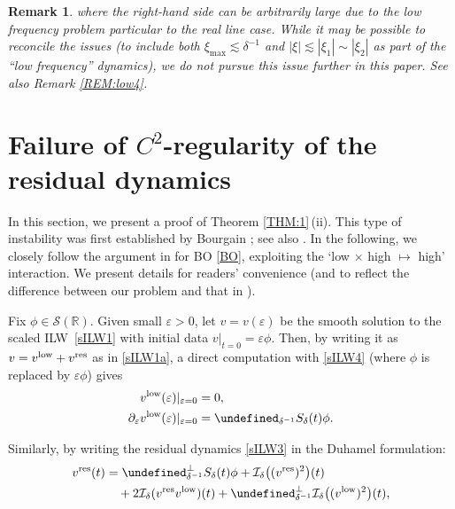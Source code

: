 \documentclass[letterpaper, 11pt,  reqno]{amsart}
\newtheorem{remark}[theorem]{Remark}
\newcommand{\1}{\hspace{0.5mm}\textup{I}\hspace{0.5mm}}
\newcommand{\I}{\mathcal{I}}
\newcommand{\noi}{\noindent}
\newcommand{\R}{\mathbb{R}}
\let\P= \undefined
\newcommand{\P}{\mathbf{P}}
\newcommand{\low}{\textup{low}}
\newcommand{\high}{\textup{res}}
\newcommand{\dl}{\delta}
\newcommand{\eps}{\varepsilon}
\newcommand{\dd}{\partial}
\newcommand{\les}{\lesssim}
\renewcommand{\S}{\mathcal{S}}
\numberwithin{equation}{section}
\numberwithin{theorem}{section}
\begin{document}
\begin{remark}
\noi
where the right-hand side can be arbitrarily large
due to the low frequency problem particular
to the real line case.
While it may be possible to reconcile the issues
(to include
both 
$\xi_{\max} \les \dl^{-1}$
and
$ |\xi| \les |\xi_1| \sim |\xi_2|$ as part of the ``low frequency'' dynamics), 
we do not pursue this issue further in this paper.
See also Remark \ref{REM:low4}.
\end{remark}




\section{Failure of $C^2$-regularity of the residual dynamics}
\label{SEC:high}


In this section, we present a proof of Theorem \ref{THM:1}\,(ii).
This type of instability was first established by Bourgain \cite{BO97};
see also \cite{Tzv}.
In the following, we closely 
follow the argument in \cite{MST}
for BO \eqref{BO}, 
exploiting 
the `low $\times$ high $\mapsto$ high' interaction.
We present details for readers' convenience
(and to reflect the difference between our problem and that in \cite{MST}).






Fix $\phi \in \S(\R)$.
Given small $\eps > 0$,
let  $v  = v(\eps)$ be the smooth solution to the scaled ILW~\eqref{sILW1}
with initial data $v|_{t = 0} = \eps \phi$.
Then, by writing  it as
$v = v^\low + v^\high$ as in \eqref{sILW1a}, 
a direct computation with \eqref{sILW4}
(where $\phi$ is replaced by $\eps \phi$)
gives
\begin{align}
\begin{split}
v^\low(\eps)|_{\eps = 0} & = 0, \\
\dd_\eps v^\low(\eps)|_{\eps = 0} 
& =  \P_{ \dl^{-1}} S_\dl(t) \phi.
\end{split}
\label{der1}
\end{align}

\noi
Similarly,
by writing 
the residual dynamics \eqref{sILW3} in the Duhamel formulation:
\begin{align}
\begin{split}
v^\high(t) 
& =  \P_{ \dl^{-1}}^\perp S_\dl(t) \phi
+ \I_\dl\big( (v^\high)^2\big)(t)\\
& \quad 
+ 2 \I_\dl( v^\high v^\low)(t)
+ \P_{ \dl^{-1}}^\perp \I_\dl\big( (v^\low)^2\big)(t), 
\end{split}
\label{sILW5}
\end{align}
\end{document}
